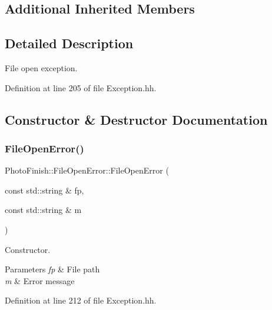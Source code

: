 \subsection*{Additional Inherited Members}


\subsection{Detailed Description}
File open exception. 

Definition at line 205 of file Exception.\+hh.



\subsection{Constructor \& Destructor Documentation}
\mbox{\label{class_photo_finish_1_1_file_open_error_a683da276a4bd5ba7d9fd4c609f93a22f}} 
\subsubsection{\texorpdfstring{File\+Open\+Error()}{FileOpenError()}\hspace{0.1cm}{\footnotesize\ttfamily [1/2]}}
{\footnotesize\ttfamily Photo\+Finish\+::\+File\+Open\+Error\+::\+File\+Open\+Error (\begin{DoxyParamCaption}\item[{const std\+::string \&}]{fp,  }\item[{const std\+::string \&}]{m }\end{DoxyParamCaption})\hspace{0.3cm}{\ttfamily [inline]}}



Constructor. 


\begin{DoxyParams}{Parameters}
{\em fp} & File path \\
\hline
{\em m} & Error message \\
\hline
\end{DoxyParams}


Definition at line 212 of file Exception.\+hh.

\mbox{\label{class_photo_finish_1_1_file_open_error_aafdab17a05d3ccd006582a07f949173f}} 
